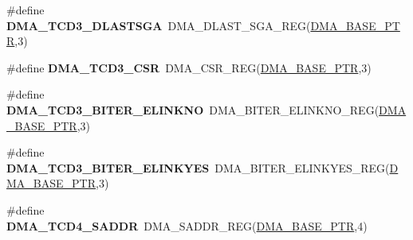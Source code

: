 \begin{DoxyCompactItemize}
\item 
\hypertarget{group___d_m_a___register___accessor___macros_ga5a4b16e69f639dffe7081c7e8b083cbe}{}\#define {\bfseries D\+M\+A\+\_\+\+T\+C\+D3\+\_\+\+D\+L\+A\+S\+T\+S\+G\+A}~D\+M\+A\+\_\+\+D\+L\+A\+S\+T\+\_\+\+S\+G\+A\+\_\+\+R\+E\+G(\hyperlink{group___d_m_a___peripheral_ga6997fbc1b1973e9f27170217a3bd6f22}{D\+M\+A\+\_\+\+B\+A\+S\+E\+\_\+\+P\+T\+R},3)\label{group___d_m_a___register___accessor___macros_ga5a4b16e69f639dffe7081c7e8b083cbe}

\item 
\hypertarget{group___d_m_a___register___accessor___macros_ga4cd4b37d23c6c4cd59c8e75abc49a620}{}\#define {\bfseries D\+M\+A\+\_\+\+T\+C\+D3\+\_\+\+C\+S\+R}~D\+M\+A\+\_\+\+C\+S\+R\+\_\+\+R\+E\+G(\hyperlink{group___d_m_a___peripheral_ga6997fbc1b1973e9f27170217a3bd6f22}{D\+M\+A\+\_\+\+B\+A\+S\+E\+\_\+\+P\+T\+R},3)\label{group___d_m_a___register___accessor___macros_ga4cd4b37d23c6c4cd59c8e75abc49a620}

\item 
\hypertarget{group___d_m_a___register___accessor___macros_ga3b8e5cd5463badcff9d9de63e01ba131}{}\#define {\bfseries D\+M\+A\+\_\+\+T\+C\+D3\+\_\+\+B\+I\+T\+E\+R\+\_\+\+E\+L\+I\+N\+K\+N\+O}~D\+M\+A\+\_\+\+B\+I\+T\+E\+R\+\_\+\+E\+L\+I\+N\+K\+N\+O\+\_\+\+R\+E\+G(\hyperlink{group___d_m_a___peripheral_ga6997fbc1b1973e9f27170217a3bd6f22}{D\+M\+A\+\_\+\+B\+A\+S\+E\+\_\+\+P\+T\+R},3)\label{group___d_m_a___register___accessor___macros_ga3b8e5cd5463badcff9d9de63e01ba131}

\item 
\hypertarget{group___d_m_a___register___accessor___macros_ga78fb2452c2df35600818d0dc072bb308}{}\#define {\bfseries D\+M\+A\+\_\+\+T\+C\+D3\+\_\+\+B\+I\+T\+E\+R\+\_\+\+E\+L\+I\+N\+K\+Y\+E\+S}~D\+M\+A\+\_\+\+B\+I\+T\+E\+R\+\_\+\+E\+L\+I\+N\+K\+Y\+E\+S\+\_\+\+R\+E\+G(\hyperlink{group___d_m_a___peripheral_ga6997fbc1b1973e9f27170217a3bd6f22}{D\+M\+A\+\_\+\+B\+A\+S\+E\+\_\+\+P\+T\+R},3)\label{group___d_m_a___register___accessor___macros_ga78fb2452c2df35600818d0dc072bb308}

\item 
\hypertarget{group___d_m_a___register___accessor___macros_ga6cc7248c1aac9b222666d2527404eb72}{}\#define {\bfseries D\+M\+A\+\_\+\+T\+C\+D4\+\_\+\+S\+A\+D\+D\+R}~D\+M\+A\+\_\+\+S\+A\+D\+D\+R\+\_\+\+R\+E\+G(\hyperlink{group___d_m_a___peripheral_ga6997fbc1b1973e9f27170217a3bd6f22}{D\+M\+A\+\_\+\+B\+A\+S\+E\+\_\+\+P\+T\+R},4)\label{group___d_m_a___register___accessor___macros_ga6cc7248c1aac9b222666d2527404eb72}


\end{DoxyCompactItemize}
